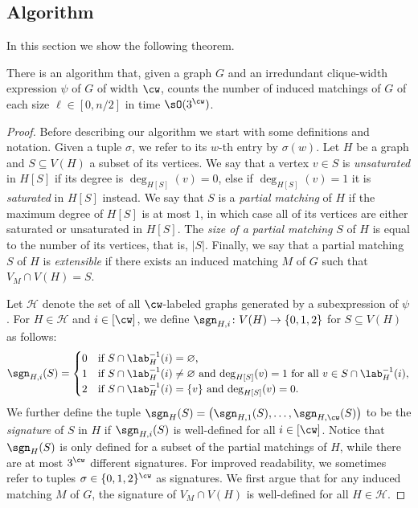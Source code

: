 \subsection{Algorithm}\label{subsec:induced:cw}

In this section we show the following theorem.

\begin{theorem}\label{thm:induced:cw}
    There is an algorithm that,
    given a graph $G$ and an irredundant clique-width expression $\psi$ of $G$ of width $\cw$,
    counts the number of induced matchings of $G$ of each size $\ell \in [0,n/2]$ in time $\sO(3^\cw)$.
\end{theorem}

\begin{proof}
    Before describing our algorithm we start with some definitions and notation.
    Given a tuple $\sigma$, we refer to its $w$-th entry by $\sigma(w)$.
    Let $H$ be a graph and $S \subseteq V(H)$ a subset of its vertices.
    We say that a vertex $v \in S$ is \emph{unsaturated} in $H[S]$ if its degree is $\deg_{H[S]} (v) = 0$,
    else if $\deg_{H[S]} (v) = 1$ it is \emph{saturated} in $H[S]$ instead.
    We say that $S$ is a \emph{partial matching} of $H$ if the maximum degree of $H[S]$ is at most $1$,
    in which case all of its vertices are either saturated or unsaturated in $H[S]$.
    The \emph{size of a partial matching} $S$ of $H$ is equal to the number of its vertices, that is, $|S|$.
    Finally, we say that a partial matching $S$ of $H$ is \emph{extensible} if there exists an induced matching $M$ of $G$
    such that $V_M \cap V(H) = S$.


    Let $\mathcal{H}$ denote the set of all $\cw$-labeled graphs generated by a subexpression of $\psi$.
    For $H \in \mathcal{H}$ and $i \in [\cw]$,
    we define $\sgn_{H,i} \colon V(H) \to \{0,1,2\}$ for $S \subseteq V(H)$ as follows:
    \[
        \sgn_{H,i}(S) =
            \begin{cases}
                0   &\text{if $S \cap \lab^{-1}_H (i) = \varnothing$,}\\
                1   &\text{if $S \cap \lab^{-1}_H (i) \neq \varnothing$ and $\deg_{H[S]}(v) = 1$ for all $v \in S \cap \lab^{-1}_H (i)$,}\\
                2   &\text{if $S \cap \lab^{-1}_H (i) = \{v\}$ and $\deg_{H[S]}(v) = 0$.}
            \end{cases}
    \]
    We further define the tuple $\sgn_H(S) = \left( \sgn_{H,1}(S), \ldots, \sgn_{H,\cw}(S) \right)$ to be
    the \emph{signature} of $S$ in $H$ if $\sgn_{H,i}(S)$ is well-defined for all $i \in [\cw]$.
    Notice that $\sgn_H(S)$ is only defined for a subset of the partial matchings of $H$,
    while there are at most $3^{\cw}$ different signatures.
    For improved readability, we sometimes refer to tuples $\sigma \in \{0,1,2\}^{\cw}$ as signatures.
    We first argue that for any induced matching $M$ of $G$,
    the signature of $V_M \cap V(H)$ is well-defined for all $H \in \mathcal{H}$.


\end{proof}
